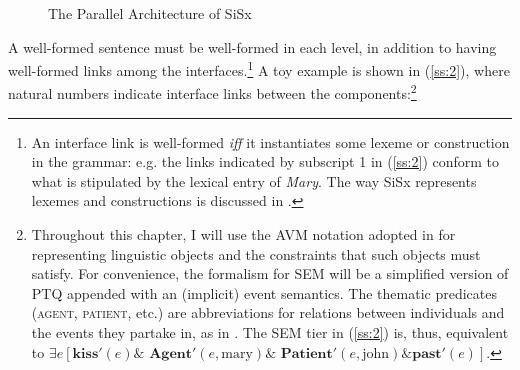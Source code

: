 \documentclass[output=paper,hidelinks]{langscibook}
\begin{document}
\begin{figure}
\begin{center}
\vspace{-20pt}
\caption{The Parallel Architecture of SiSx}
\label{ss:sspa}
\end{center}
\end{figure}



A well-formed sentence must be well-formed in each level, in addition to having well-formed links among the interfaces.\footnote{An interface link is well-formed \textit{iff} it instantiates some lexeme or construction in the grammar: e.g. the links indicated by subscript 1 in (\ref{ss:2}) conform to what is stipulated by the lexical entry of \textit{Mary}. The way SiSx represents lexemes and constructions is discussed in .} A toy example is shown in (\ref{ss:2}), where natural numbers indicate interface links between the components:\footnote{Throughout this chapter, I will use the AVM notation adopted in \citet{culicover2019origin} for representing linguistic objects and the constraints that such objects must satisfy. For convenience, the formalism for SEM will be a simplified version of  PTQ appended with an (implicit) event semantics. The thematic predicates (\textsc{agent}, \textsc{patient}, etc.) are abbreviations for relations between individuals and the events they partake in, as in \citet{parsons1990events}. The SEM tier in (\ref{ss:2}) is, thus, equivalent to $\exists e[\textbf{kiss}'(e) \& \textbf{ Agent}'(e,\textrm{mary}) \& \textbf{ Patient}'(e,\textrm{john})\& \textbf{past}'(e)]$.}

\end{document}

